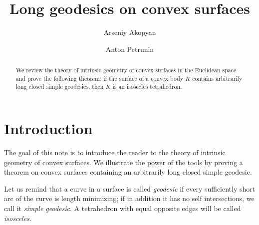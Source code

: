 \documentclass[oneside,a4paper, 12pt]{article}
\begin{document}
\title{Long geodesics on convex surfaces}
\author{Arseniy Akopyan
\and 
Anton Petrunin}
\newcommand{\Addresses}{{\bigskip\footnotesize

Arseniy Akopyan, 
\par\nopagebreak\textsc{Institute of Science and Technology Austria,} 
\par\nopagebreak\textsc{Am Campus 1, 3400 Klosterneuburg, Austria.}
\par\nopagebreak\textit{Email}: \texttt{akopjan@gmail.com}

\medskip

Anton Petrunin, 
\par\nopagebreak\textsc{Mathematics Department,} 
\par\nopagebreak\textsc{Pennsylvania State University,}
\par\nopagebreak\textsc{University Park, PA 16802, USA}
  \par\nopagebreak
  \textit{Email}: \texttt{petrunin@math.psu.edu}
}}
\date{}
\maketitle

\begin{abstract}
We review the theory of intrinsic geometry of convex surfaces in the Euclidean space and prove the following theorem: 
if the surface of a convex body $K$ contains arbitrarily long closed simple geo\-de\-sics, then $K$ is an isosceles tetrahedron.
\end{abstract}


\section{Introduction}
The goal of this note is to introduce the reader to the theory of intrinsic geometry of convex surfaces.
We illustrate the power of the tools by proving a theorem on convex surfaces containing an arbitrarily long closed simple geodesic. 

Let us remind that a curve in a surface is called \emph{geodesic} if every sufficiently short arc of the curve is length minimizing; if in addition it has no self intersections, we call it \emph{simple geodesic}.
A tetrahedron with equal opposite edges will be called \emph{isosceles}.
\end{document}

